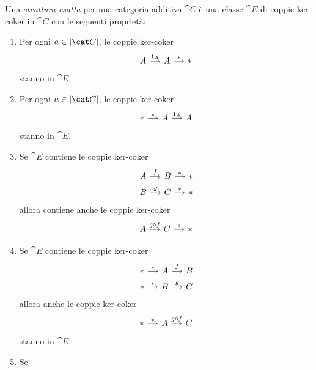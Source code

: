 \begin{definition}\label{definition:CategorieEsatte}
  Una {\em struttura esatta} per una categoria additiva \(\cat C\) è una
  classe \(\cat E\) di coppie ker-coker in \(\cat C\) con le seguenti
  proprietà:
  \begin{enumerate}[leftmargin=*, label=(E\arabic*),
    ref=Definizione~\ref{definition:CategorieEsatte}-E\arabic*]
  \item \label{item:EO} Per ogni \(a \in \objcat C\), le coppie
    ker-coker
    \[
      \begin{tikzcd}[column sep=small]
        A \ar["{\id_A}", r] & A \ar["{\ast}", r] & \ast
      \end{tikzcd}
    \]
    stanno in \(\cat E\).
  \item \label{item:EOop} Per ogni \(a \in \objcat C\), le coppie
    ker-coker
    \[
      \begin{tikzcd}[column sep=small]
        \ast \ar["{\ast}", r] & A \ar["{\id_A}", r] & A
      \end{tikzcd}
    \]
    stanno in \(\cat E\).
  \item \label{item:E1} Se \(\cat E\) contiene le coppie ker-coker
    \[
      \begin{tikzcd}[column sep=small, row sep=tiny]
        A \ar["{f}", r] & B \ar["{\ast}", r] & \ast \\
        B \ar["{g}", r] & C \ar["{\ast}", r] & \ast
      \end{tikzcd}
    \]
    allora contiene anche le coppie ker-coker
    \[
      \begin{tikzcd}[column sep=small]
        A \ar["{g \circ f}", r] & C \ar["{\ast}", r] & \ast
      \end{tikzcd}
    \]
  \item \label{item:E1op} Se \(\cat E\) contiene le coppie ker-coker
    \[
      \begin{tikzcd}[column sep=small, row sep=tiny]
        \ast \ar["{\ast}", r] & A \ar["{f}", r] & B \\
        \ast \ar["{\ast}", r] & B \ar["{g}", r] & C
      \end{tikzcd}
    \]
    allora anche le coppie ker-coker
    \[
      \begin{tikzcd}[column sep=small]
        \ast \ar["{\ast}", r] & A \ar["{g \circ f}", r] & C
      \end{tikzcd}
    \]
    stanno in \(\cat E\).
  \item \label{item:E2} Se
    \[
      \begin{tikzcd}[column sep=small]

\end{tikzcd}\]
\end{enumerate}
\end{definition}

